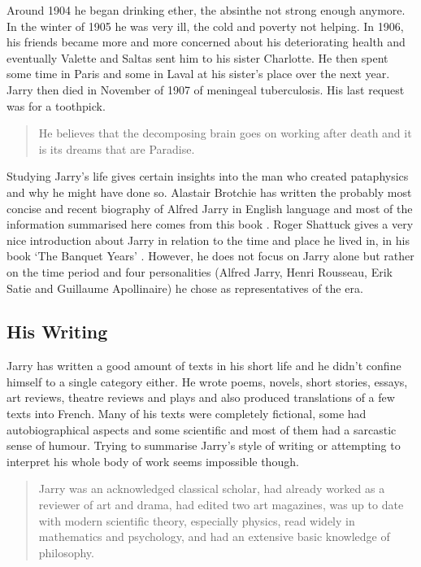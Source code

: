 Around 1904 he began drinking ether, the absinthe not strong enough anymore. In the winter of 1905 he was very ill, the cold and poverty not helping. In 1906, his friends became more and more concerned about his deteriorating health and eventually Valette and Saltas sent him to his sister Charlotte. He then spent some time in Paris and some in Laval at his sister's place over the next year. Jarry then died in November of 1907 of meningeal tuberculosis. His last request was for a toothpick.

\begin{quotation}
  He believes that the decomposing brain goes on working after death and it is its dreams that are Paradise. 
\end{quotation}

Studying Jarry's life gives certain insights into the man who created pataphysics and why he might have done so. Alastair Brotchie has written the probably most concise and recent biography of Alfred Jarry in English language and most of the information summarised here comes from this book \autocite{Brotchie2011}. Roger Shattuck gives a very nice introduction about Jarry in relation to the time and place he lived in, in his book `The Banquet Years' \autocite{Shattuck1959}. However, he does not focus on Jarry alone but rather on the time period and four personalities (Alfred Jarry, Henri Rousseau, Erik Satie and Guillaume Apollinaire) he chose as representatives of the era.


\subsection*{His Writing}

Jarry has written a good amount of texts in his short life and he didn't confine himself to a single category either. He wrote poems, novels, short stories, essays, art reviews, theatre reviews and plays and also produced translations of a few texts into French. Many of his texts were completely fictional, some had autobiographical aspects and some scientific and most of them had a sarcastic sense of humour. Trying to summarise Jarry's style of writing or attempting to interpret his whole body of work seems impossible though.

\begin{quotation}
  Jarry was an acknowledged classical scholar, had already worked as a reviewer of art and drama, had edited two art magazines, was up to date with modern scientific theory, especially physics, read widely in mathematics and psychology, and had an extensive basic knowledge of philosophy. 
\end{quotation}

